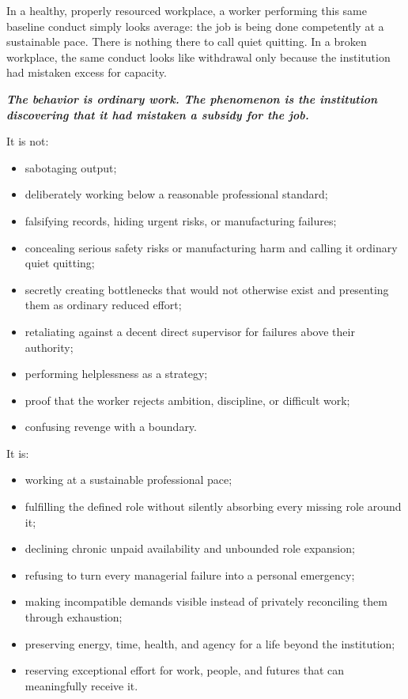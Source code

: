 \documentclass[11pt,oneside]{article}
\providecommand{\tightlist}{%
  \setlength{\itemsep}{0.22em}\setlength{\parskip}{0pt}}
\renewenvironment{quote}
  {\begin{tcolorbox}[
      enhanced,
      breakable,
      colback=ManifestLight,
      colframe=ManifestRule,
      boxrule=0pt,
      leftrule=3pt,
      arc=0pt,
      outer arc=0pt,
      left=10pt,right=10pt,top=8pt,bottom=8pt,
      before skip=0.8em,after skip=0.8em
    ]\itshape}
  {\end{tcolorbox}}
\begin{document}
In a healthy, properly resourced workplace, a worker performing this
same baseline conduct simply looks average: the job is being done
competently at a sustainable pace. There is nothing there to call quiet
quitting. In a broken workplace, the same conduct looks like withdrawal
only because the institution had mistaken excess for capacity.

\begin{quote}
\textbf{The behavior is ordinary work. The phenomenon is the institution
discovering that it had mistaken a subsidy for the job.}
\end{quote}

It is not:

\begin{itemize}
\tightlist
\item
  sabotaging output;
\item
  deliberately working below a reasonable professional standard;
\item
  falsifying records, hiding urgent risks, or manufacturing failures;
\item
  concealing serious safety risks or manufacturing harm and calling it
  ordinary quiet quitting;
\item
  secretly creating bottlenecks that would not otherwise exist and
  presenting them as ordinary reduced effort;
\item
  retaliating against a decent direct supervisor for failures above
  their authority;
\item
  performing helplessness as a strategy;
\item
  proof that the worker rejects ambition, discipline, or difficult work;
\item
  confusing revenge with a boundary.
\end{itemize}

It is:

\begin{itemize}
\tightlist
\item
  working at a sustainable professional pace;
\item
  fulfilling the defined role without silently absorbing every missing
  role around it;
\item
  declining chronic unpaid availability and unbounded role expansion;
\item
  refusing to turn every managerial failure into a personal emergency;
\item
  making incompatible demands visible instead of privately reconciling
  them through exhaustion;
\item
  preserving energy, time, health, and agency for a life beyond the
  institution;
\item
  reserving exceptional effort for work, people, and futures that can
  meaningfully receive it.
\end{itemize}
\end{document}
